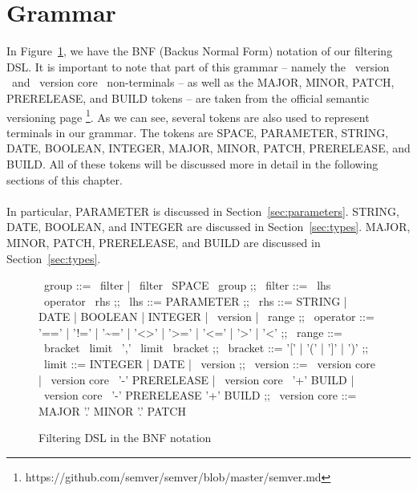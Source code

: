 \section{Grammar}\label{sec:grammar}
In Figure~\ref{fig:bnf}, we have the BNF (Backus Normal Form) notation of our filtering DSL\@.
It is important to note that part of this grammar -- namely the \textlangle~version \textrangle~and \textlangle~version core \textrangle~non-terminals -- as well as the MAJOR, MINOR, PATCH, PRERELEASE, and BUILD tokens -- are taken from the official semantic versioning page \footnote{https://github.com/semver/semver/blob/master/semver.md}.
As we can see, several tokens are also used to represent terminals in our grammar.
The tokens are SPACE, PARAMETER, STRING, DATE, BOOLEAN, INTEGER, MAJOR, MINOR, PATCH, PRERELEASE, and BUILD\@.
All of these tokens will be discussed more in detail in the following sections of this chapter. \\ \\
In particular, PARAMETER is discussed in Section~\ref{sec:parameters}.
STRING, DATE, BOOLEAN, and INTEGER are discussed in Section~\ref{sec:types}.
MAJOR, MINOR, PATCH, PRERELEASE, and BUILD are discussed in Section~\ref{sec:types}.

\begin{figure}[!h]
    \begin{center}
        \begin{bnf}
            \textlangle~group \textrangle ::= \textlangle~filter \textrangle | \textlangle~filter \textrangle~SPACE \textlangle~group \textrangle
            ;;
            \textlangle~filter \textrangle ::= \textlangle~lhs \textrangle \textlangle~operator \textrangle \textlangle~rhs \textrangle
            ;;
            \textlangle~lhs \textrangle ::= PARAMETER
            ;;
            \textlangle~rhs \textrangle ::= STRING | DATE | BOOLEAN | INTEGER | \textlangle~version \textrangle | \textlangle~range \textrangle
            ;;
            \textlangle~operator \textrangle ::= '==' | '!=' | '\textasciitilde=' | '<>' | '>=' | '<=' | '>' | '<'
            ;;
            \textlangle~range \textrangle ::= \textlangle~bracket \textrangle \textlangle~limit \textrangle~',' \textlangle~limit \textrangle \textlangle~bracket \textrangle
            ;;
            \textlangle~bracket \textrangle ::= '[' | '(' | ']' | ')'
            ;;
            \textlangle~limit \textrangle ::= INTEGER | DATE | \textlangle~version \textrangle
            ;;
            \textlangle~version \textrangle ::= \textlangle~version core \textrangle | \textlangle~version core \textrangle~'-' PRERELEASE | \textlangle~version core \textrangle~'+' BUILD | \textlangle~version core \textrangle~'-' PRERELEASE '+' BUILD
            ;;
            \textlangle~version core \textrangle ::= MAJOR '.' MINOR '.' PATCH
        \end{bnf}
    \end{center}

    \caption{Filtering DSL in the BNF notation}
    \label{fig:bnf}
\end{figure}

